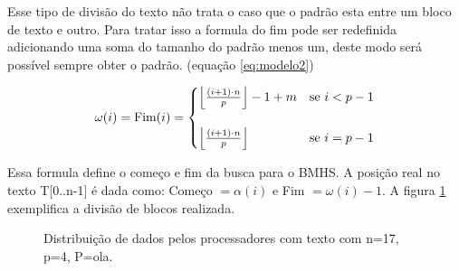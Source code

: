 \documentclass[11pt]{article}
\begin{document}
Esse tipo de divisão do texto não trata o caso que o padrão esta entre um bloco de texto e outro. Para tratar isso a formula do fim pode ser redefinida adicionando uma soma do tamanho do padrão menos um, deste modo será possível sempre obter o padrão. (equação \ref{eq:modelo2})

\begin{equation}
\omega (i)=\text{Fim}(i) = 
\begin{cases} 
\floor*{\frac{(i+1)\cdot n}{p}}-1+m &\text{se } i<p-1\\
\\
\floor*{\frac{(i+1)\cdot n}{p}} &\text{se } i=p-1
\end{cases}
\label{eq:modelo2}
\end{equation}

Essa formula define o começo e fim da busca para o BMHS. A posição real no texto T[0..n-1] é dada como: Começo \(= \alpha (i)\) e Fim  \(= \omega (i)-1\). A figura \ref{fig:exemploparalelo} exemplifica a divisão de blocos realizada.

\begin{figure}
\begin{center}
\end{center}
\caption{Distribuição de dados pelos processadores com texto com n=17, p=4, P=ola.}\label{fig:exemploparalelo}
\end{figure}
\end{document}
